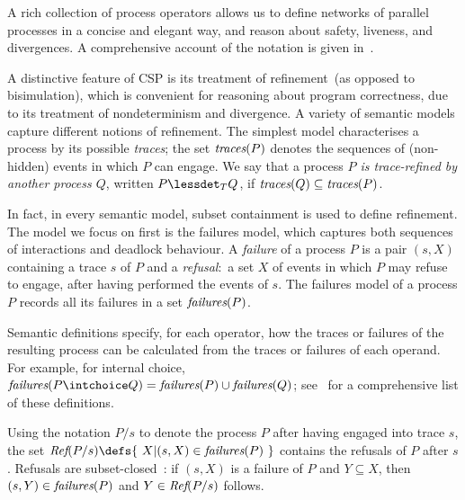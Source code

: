 A rich collection of process operators allows us to define networks of
parallel processes in a concise and elegant way, and reason about safety,
liveness, and divergences.  A comprehensive account of the notation is given
in~\cite{Roscoe2010}.

A distinctive feature of CSP is its treatment of refinement~(as opposed to
bisimulation), which is convenient for reasoning about program correctness,
due to its treatment of nondeterminism and divergence.  A variety of semantic
models capture different notions of refinement. The simplest model
characterises a process by its possible \emph{traces}; the set $\text{\it traces}(P)$
denotes the sequences of (non-hidden) events in which $P$ can engage.  We say
that a process \emph{$P$ is trace-refined by another process $Q$}, written $P
\lessdet_T Q$, if $\text{\it traces}(Q)\subseteq \text{\it traces}(P)$.

In fact, in every semantic model, subset containment is used to define refinement. The
model we focus on first is the failures model, which captures both
sequences of interactions and deadlock behaviour. A \emph{failure} of a process $P$
is a pair $(s,X)$ containing a trace $s$ of $P$ and a \emph{refusal}:~a set $X$ of
events in which $P$ may refuse to engage, after having performed the events of
$s$. The failures model of a process $P$ records all its failures in a set
$\text{\it failures}(P)$.

Semantic definitions specify, for each operator, how the traces or failures
of the resulting process can be calculated from the traces or failures of
each operand. For example, for internal choice, $\fails(P\intchoice Q) =
\fails(P)\cup\fails(Q)$; see~\cite[p.~210]{Roscoe:1997:TPC:550448} for a
comprehensive list of these definitions.

Using the notation $P/s$ to denote the process $P$ after having engaged into
trace $s$, the set $\refs(P/s) \defs \{~X | (s,X) \in \fails(P)~\}$ contains
the  refusals of $P$ after $s$. Refusals are
subset-closed~\cite{Hoare:1985:CSP:3921,Roscoe2010}: if $(s,X)$ is a failure
of $P$ and $Y\subseteq X$, then $(s,Y)\in\text{\it failures}(P)$ and $Y\in\text{\it Ref}(P/s)$
follows.

